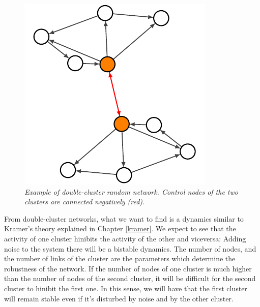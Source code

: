 \begin{figure}
\centering
\includegraphics[scale=1.4]{images/doublecluster.pdf}
\caption{\emph{Example of double-cluster random network. Control nodes of the two clusters are connected negatively (red).}}
\label{fig:doublecluster}
\end{figure}

From double-cluster networks, what we want to find is a dynamics similar to Kramer's theory explained in Chapter \ref{kramer}. We expect to see that the activity of one cluster hinibits the activity of the other and viceversa: Adding noise to the system there will be a bistable dynamics.
The number of nodes, and the number of links of the cluster are the parameters which determine the robustness of the network. If the number of nodes of one cluster is much higher than the number of nodes of the second cluster, it will be difficult for the second cluster to hinibit the first one.
In this sense, we will have that the first cluster will remain stable even if it's disturbed by noise and by the other cluster.
